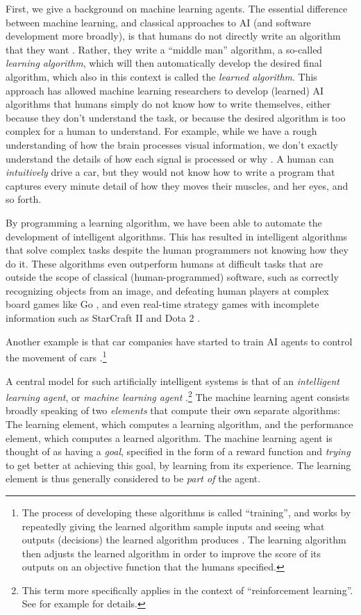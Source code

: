 First, we give a background on machine learning agents. The essential difference between machine learning, and classical approaches to AI (and software development more broadly), is that humans do not directly write an algorithm that they want \citep{Russell2010}. Rather, they write a “middle man” algorithm, a so-called \textit{learning algorithm}, which will then automatically develop the desired final algorithm, which also in this context is called the \textit{learned algorithm}. This approach has allowed machine learning researchers to develop (learned) AI algorithms that humans simply do not know how to write themselves, either because they don’t understand the task, or because the desired algorithm is too complex for a human to understand. For example, while we have a rough understanding of how the brain processes visual information, we don’t exactly understand the details of how each signal is processed or why \citep{Goodfellow2016}. A human can \textit{intuitively} drive a car, but they would not know how to write a program that captures every minute detail of how they moves their muscles, and her eyes, and so forth.




By programming a learning algorithm, we have been able to automate the development of intelligent algorithms. This has resulted in intelligent algorithms that solve complex tasks despite the human programmers not knowing how they do it. These algorithms even outperform humans at difficult tasks that are outside the scope of classical (human-programmed) software, such as correctly recognizing objects from an image, and defeating human players at complex board games like Go \citep{Silver2016,Silver2017}, and even real-time strategy games with incomplete information such as StarCraft II \citep{Vinyals2017,alphastarblog2019} and Dota 2 \citep{OpenAI2018}. 
 
 Another example is that car companies have started to train AI agents to control the movement of cars \citep{Hodges2019}.\footnote{The process of developing these algorithms is called “training”, and works by repeatedly giving the learned algorithm sample inputs and seeing what outputs (decisions) the learned algorithm produces \citep{Goodfellow2016}. The learning algorithm then adjusts the learned algorithm in order to improve the score of its outputs on an objective function that the humans specified.}

A central model for such artificially intelligent systems is that of an \textit{intelligent learning agent}, or \textit{machine learning agent} \citep{Russell2010}.\footnote{This term more specifically applies in the context of “reinforcement learning”. See for example \citep{Sutton1998} for details.} The machine learning agent consists broadly speaking of two \textit{elements} that compute their own separate algorithms: The learning element, which computes a learning algorithm, and the performance element, which computes a learned algorithm. The machine learning agent is thought of as having a \textit{goal}, specified in the form of a reward function and \textit{trying} to get better at achieving this goal, by learning from its experience. The learning element is thus generally considered to be \textit{part of} the agent. 

